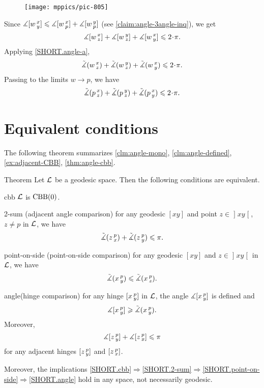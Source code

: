 \begin{wrapfigure}{o}{30 mm}
\vskip-4mm
\centering
\texttt{[image: mppics/pic-805]}
\vskip4mm
\end{wrapfigure}

Since $\measuredangle[w\,{}^{x}_{y}]\leqslant \measuredangle[w\,{}^{x}_{p}] +\measuredangle[w\,{}^{y}_{p}]$ (see \ref{claim:angle-3angle-inq}), we get 
\[\mangle\hinge w x z+ \mangle\hinge w y z +\mangle\hinge w x y
\le
2\cdot\pi.\]
Applying \ref{SHORT.angle-a}, 
\[\angk w x z
+ \angk w y z 
+\angk w x y
\le
2\cdot\pi.\]
Passing to the limits $w\to p$, we have
\[\angk p x z 
+ \angk p y z 
+\angk p x y
\le
2\cdot\pi.\]
\qedsf

\section{Equivalent conditions}

The following theorem summarizes \ref{clm:angle-mono}, \ref{clm:angle-defined}, \ref{ex:adjacent-CBB}, \ref{thm:angle-cbb}.

\begin{thm}{Theorem}\label{thm:defs_of_alex} 
Let $\mathcal{L}$ be a geodesic space.
Then the following conditions are equivalent.

\begin{subthm}{cbb}
$\mathcal{L}$ is $\mathrm{CBB}(0)$.
\end{subthm}
 

\begin{subthm}{2-sum} 
(adjacent angle comparison) for any geodesic $[x y]$ and point $z\in \mathopen{]}x y\mathclose{[}$, $z\ne p$ in $\mathcal{L}$, we have
\[\tilde\measuredangle(z\,{}^{p}_{x})
+\tilde\measuredangle(z\,{}^{p}_{y})\leqslant \pi.\]
\end{subthm}

\begin{subthm}{point-on-side}
(point-on-side comparison)
for any geodesic $[x y]$ and $z\in \mathopen{]}x y\mathclose{[}$ in $\mathcal{L}$, we have
\[\tilde\measuredangle(x\,{}^{p}_{y})\leqslant\tilde\measuredangle(x\,{}^{p}_{z}).\]
\end{subthm}

\begin{subthm}{angle}(hinge comparison)
for any hinge $[x\,{}^{p}_{y}]$ in $\mathcal{L}$, the angle 
$\measuredangle[x\,{}^{p}_{y}]$ is defined and 
\[\measuredangle[x\,{}^{p}_{y}]\geqslant\tilde\measuredangle(x\,{}^{p}_{y}).\]
Moreover, 
\[\measuredangle[z\,{}^{p}_{y}] + \measuredangle[z\,{}^{p}_{x}]\leqslant\pi\]
for any adjacent hinges $[z\,{}^{p}_{y}]$ and $[z\,{}^{p}_{x}]$.
\end{subthm}

Moreover, the implications \ref{SHORT.cbb}$\Rightarrow$\ref{SHORT.2-sum}$\Rightarrow$\ref{SHORT.point-on-side}$\Rightarrow$\ref{SHORT.angle} hold in any space, not necessarily geodesic.
\end{thm}

